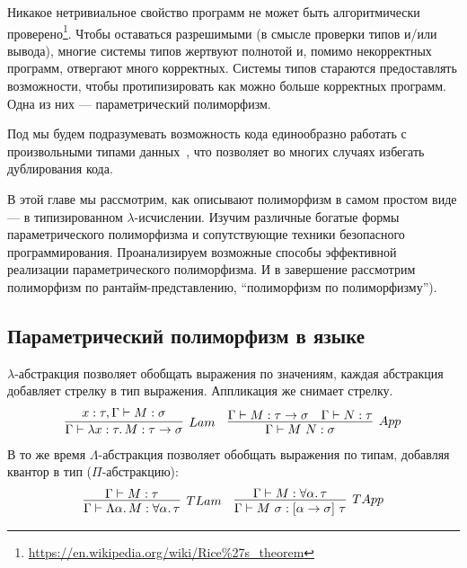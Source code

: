 
Никакое нетривиальное свойство программ не может быть алгоритмически проверено\footnote{\url{https://en.wikipedia.org/wiki/Rice\%27s_theorem}}.
Чтобы оставаться разрешимыми (в смысле проверки типов и/или вывода), многие системы типов жертвуют полнотой и, помимо некорректных программ, отвергают много корректных.
Системы типов стараются предоставлять возможности, чтобы протипизировать как можно больше корректных программ.
Одна из них --- параметрический полиморфизм.

Под  мы будем подразумевать возможность кода единообразно работать с произвольными типами данных~\cite{strachey2000fundamental, cardelli1985understanding}, что позволяет во многих случаях избегать дублирования кода.

В этой главе мы рассмотрим, как описывают полиморфизм в самом простом виде --- в типизированном $\lambda$-исчислении.
Изучим различные богатые формы параметрического полиморфизма и сопутствующие техники безопасного программирования.
Проанализируем возможные способы эффективной реализации параметрического полиморфизма.
И в завершение рассмотрим полиморфизм по рантайм-представлению, ``полиморфизм по полиморфизму'').

\subsection{Параметрический полиморфизм в языке} \label{subsec:lang-parametric-polumorphism}

$\lambda$-абстракция позволяет обобщать выражения по значениям, каждая абстракция добавляет стрелку в тип выражения.
Аппликация же снимает стрелку.
\[
    \begin{array}{cc}
        \infer[Lam]{\Gamma\vdash \lambda x : \tau\ldotp M : \tau\to\sigma}{x : \tau, \Gamma\vdash M : \sigma}
        &
        \infer[App]{\Gamma\vdash M\ap N : \sigma}{\Gamma\vdash M : \tau\to\sigma & \Gamma\vdash N : \tau}
    \end{array}
\]
В то же время $\Lambda$-абстракция позволяет обобщать выражения по типам, добавляя квантор в тип ($\Pi$-абстракцию):
\[
    \begin{array}{cc}
        \infer[TLam]{\Gamma\vdash\Lambda\alpha\ldotp M : \forall\alpha\ldotp\tau}{\Gamma\vdash M : \tau}
        &
        \infer[TApp]{\Gamma\vdash M\ap\sigma : [\alpha\to\sigma]\ap\tau}{\Gamma\vdash M : \forall\alpha\ldotp\tau}
    \end{array}
\]

